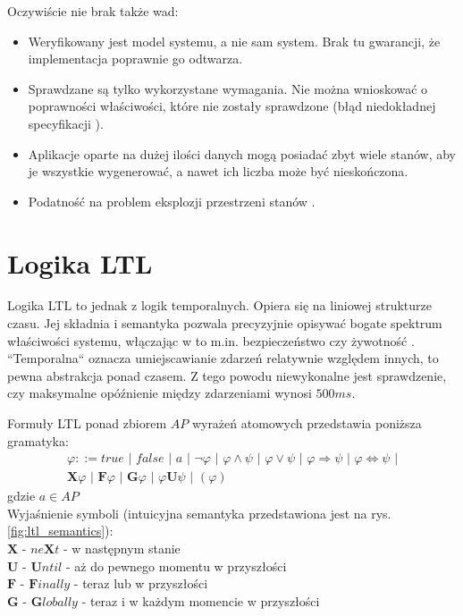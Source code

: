 \vspace{0.5cm}
\noindent
Oczywiście nie brak także wad:
\begin{itemize}
\item Weryfikowany jest model systemu, a nie sam system. Brak tu gwarancji, że implementacja poprawnie go odtwarza.
\item Sprawdzane są tylko wykorzystane wymagania. Nie można wnioskować o poprawności właściwości, które nie zostały sprawdzone (błąd niedokładnej specyfikacji \cite{Lam05}).
\item Aplikacje oparte na dużej ilości danych mogą posiadać zbyt wiele stanów, aby je wszystkie wygenerować, a nawet ich liczba może być nieskończona.
\item Podatność na problem eksplozji przestrzeni stanów \cite{Cla11}.
\end{itemize}


\section{Logika LTL}

Logika LTL to jednak z logik temporalnych. Opiera się na liniowej strukturze czasu.
Jej składnia i semantyka pozwala precyzyjnie opisywać bogate spektrum właściwości systemu, włączając w to m.in. bezpieczeństwo czy żywotność \cite{Bel17}.
``Temporalna`` oznacza umiejscawianie zdarzeń relatywnie względem innych, to pewna abstrakcja ponad czasem.  Z tego powodu niewykonalne jest sprawdzenie, czy maksymalne opóźnienie między zdarzeniami wynosi $500ms$.

Formuły LTL ponad zbiorem $AP$ wyrażeń atomowych przedstawia poniższa gramatyka:
\begin{gather}
\varphi::= true \,\, | \,\, false \,\, | \,\, a \,\, | \,\, \neg\varphi \,\, | \,\, \varphi \land \psi \,\, | \,\, \varphi \lor \psi \,\, | \,\, \varphi \Rightarrow \psi \,\, | \,\, \varphi \Leftrightarrow \psi \,\, | \nonumber\\
\mathbf{X}\varphi \,\, | \,\, \mathbf{F}\varphi \,\, | \,\, \mathbf{G}\varphi \,\, | \,\, \varphi\mathbf{U}\psi \,\, | \,\, (\varphi)\nonumber
\end{gather}
gdzie $a \in AP$ \\
Wyjaśnienie symboli (intuicyjna semantyka przedstawiona jest na rys. \ref{fig:ltl_semantics}): \\
$\mathbf{X}$ - $ne\mathbf{X}t$ - w następnym stanie \\
$\mathbf{U}$ - $\mathbf{U}ntil$ - aż do pewnego momentu w przyszłości \\
$\mathbf{F}$ - $\mathbf{F}inally$ - teraz lub w przyszłości \\
$\mathbf{G}$ - $\mathbf{G}lobally$ - teraz i w każdym momencie w przyszłości
\vspace{0.5cm}


